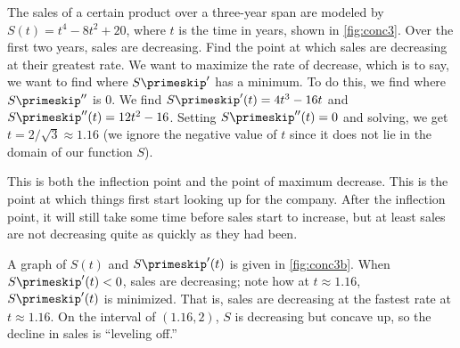 \begin{example}\label{ex_conc3}%
The sales of a certain product over a three-year span are modeled by $S(t)= t^4-8t^2+20$, where $t$ is the time in years, shown in \autoref{fig:conc3}.  Over the first two years, sales are decreasing.  Find the point at which sales are decreasing at their greatest rate.
\solution
We want to maximize the rate of decrease, which is to say, we want to find where $S\primeskip'$ has a minimum.  To do this, we find where $S\primeskip''$ is 0.  We find $S\primeskip'(t)=4t^3-16t$ and $S\primeskip''(t)=12t^2-16$.  Setting $S\primeskip''(t)=0$ and solving, we get $t=2/\sqrt3\approx 1.16$ (we ignore the negative value of $t$ since it does not lie in the domain of our function $S$).


\begin{center}
\end{center}

This is both the inflection point and the point of maximum decrease.  This is the point at which things first start looking up for the company.  After the inflection point, it will still take some time before sales start to increase, but at least sales are not decreasing quite as quickly as they had been.

A graph of $S(t)$ and $S\primeskip'(t)$ is given in \autoref{fig:conc3b}. When $S\primeskip'(t)<0$, sales are decreasing; note how at $t\approx 1.16$, $S\primeskip'(t)$ is minimized. That is, sales are decreasing at the fastest rate at $t\approx 1.16$.  On the interval of $(1.16,2)$, $S$ is decreasing but concave up, so the decline in sales is ``leveling off.''
\end{example}


